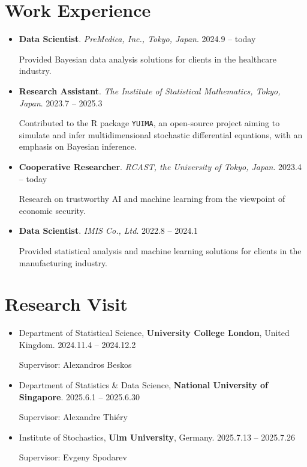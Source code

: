 \documentclass[
  11pt,
]{article}
\renewcommand{\labelitemi}{\textcolor{minty}{\faCheckCircle}} %
\begin{document}
\section{Work Experience}\label{work-experience}

\renewcommand{\labelitemi}{\textcolor{minty}{\faSuitcase}}

\begin{itemize}
\item
  \textbf{Data Scientist}. \emph{PreMedica, Inc., Tokyo, Japan}.
  \hfill {2024.9 -- today}

  Provided Bayesian data analysis solutions for clients in the
  healthcare industry.
\item
  \textbf{Research Assistant}. \emph{The Institute of Statistical
  Mathematics, Tokyo, Japan}. \hfill {2023.7 -- 2025.3}

  Contributed to the R package \texttt{YUIMA}, an open-source project
  aiming to simulate and infer multidimensional stochastic differential
  equations, with an emphasis on Bayesian inference.
\item
  \textbf{Cooperative Researcher}. \emph{RCAST, the University of Tokyo,
  Japan}. \hfill {2023.4 -- today}

  Research on trustworthy AI and machine learning from the viewpoint of
  economic security.
\item
  \textbf{Data Scientist}. \emph{IMIS Co., Ltd}. \hfill {2022.8 --
  2024.1}

  Provided statistical analysis and machine learning solutions for
  clients in the manufacturing industry.
\end{itemize}

\section{Research Visit}\label{research-visit}

\renewcommand{\labelitemi}{\textcolor{minty}{\faUniversity}}

\begin{itemize}
\item
  Department of Statistical Science, \textbf{University College London},
  United Kingdom. \hfill {2024.11.4 -- 2024.12.2}

  Supervisor: Alexandros Beskos
\item
  Department of Statistics \& Data Science, \textbf{National University
  of Singapore}. \hfill {2025.6.1 -- 2025.6.30}

  Supervisor: Alexandre Thiéry
\item
  Institute of Stochastics, \textbf{Ulm University}, Germany.
  \hfill {2025.7.13 -- 2025.7.26}

  Supervisor: Evgeny Spodarev
\end{itemize}
\end{document}

